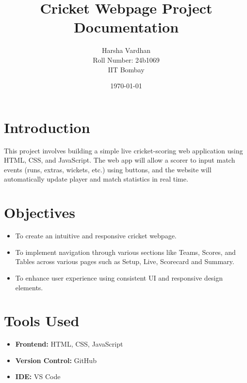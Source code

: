 \documentclass[a4paper,12pt]{article}
\title{\textbf{Cricket Webpage Project Documentation}}
\author{Harsha Vardhan \\
Roll Number: 24b1069 \\
IIT Bombay}
\date{\today}
\begin{document}
\maketitle
\tableofcontents
\newpage

\section{Introduction}
This project involves building a simple live cricket-scoring web application using HTML, CSS, and JavaScript. 
The web app will allow a scorer to input match events (runs, extras, wickets, etc.) using buttons,
and the website will automatically update player and match statistics in real time.

\section{Objectives}
\begin{itemize}
\item To create an intuitive and responsive cricket webpage.
\item To implement navigation through various sections like Teams, Scores, and Tables across various pages such as Setup, Live, Scorecard and Summary.
\item To enhance user experience using consistent UI and responsive design elements.
\end{itemize}

\section{Tools Used}
\begin{itemize}
\item \textbf{Frontend:} HTML, CSS, JavaScript
\item \textbf{Version Control:} GitHub 
\item \textbf{IDE:} VS Code
\end{itemize}
\end{document}
